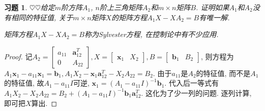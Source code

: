 \documentclass{ctexart}
\newtheorem{exercise}[thm]{习题}
\newcommand\bs[1]{\boldsymbol{ #1}}
\newcommand\hint[1]{\par {\footnotesize\kaishu 提示：#1}}
\def\hard{$\heartsuit$}
\begin{document}
\begin{exercise}\label{excs:sylvester:triangular}
\hard\hard 给定$m$阶方阵$A_1$, $n$阶上三角矩阵$A_2$和$m\times n$矩阵$B$. 
证明如果$A_1$和$A_2$没有相同的特征值, 关于$m\times n$矩阵$X$的矩阵方程$A_1X-XA_2=B$有唯一解. 

矩阵方程$A_1X-XA_2=B$称为{Sylvester方程}, 在控制论中有不少应用. 

\end{exercise}
\begin{proof}
	记$A_2=\begin{bmatrix}
		 a_{11} & \bs a_{12}^T\\ 0 &  A_{22}
	\end{bmatrix},X=\begin{bmatrix}
	\bs x_1 & X_2
	\end{bmatrix},B=\begin{bmatrix}
	\bs b_1 & B_2
	\end{bmatrix}$, 则方程为
	$A_1\bs x_1- a_{11}\bs x_1=\bs b_1,A_1X_2-\bs x_1\bs a_{12}^T-X_2 A_{22}=B_2$. 
	由于$ a_{11}$是$A_2$的特征值, 而不是$A_1$的特征值, 故$A_1- a_{11}I$可逆, $\bs x_1=(A_1- a_{11}I)^{-1}\bs b_1$. 
	代入后一等式有$A_1X_2-X_2 A_{22}=B_2+(A_1- a_{11}I)^{-1}\bs b_1\bs a_{12}^T$. 
	这化为了少一列的问题. 
	逐列计算, 即可把$X$算出. 
\end{proof}
\end{document}
